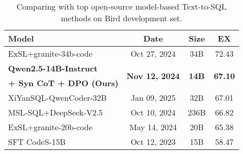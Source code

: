 \begin{table}[h!]
    \centering
\begin{adjustbox}{max width=0.8\columnwidth}
    \begin{tabular}{l | c | c | c }
    \toprule
       \textbf{Model}  & \textbf{Date} & \textbf{Size} &  \textbf{EX} \\
    \midrule
        ExSL+granite-34b-code	& Oct 27, 2024	& 34B	& 72.43 \\
    \midrule
    \textbf{Qwen2.5-14B-Instruct} & \multirow{2}{*}{\textbf{Nov 12, 2024}}	& \multirow{2}{*}{\textbf{14B}}	& \multirow{2}{*}{\textbf{67.10}} \\ 
    \textbf{+ Syn CoT + DPO (Ours)}	& & & \\
    \midrule
    XiYanSQL-QwenCoder-32B & Jan 09, 2025 & 32B & 67.01 \\
    \midrule
    MSL-SQL+DeepSeek-V2.5 &	Oct 10, 2024 &	236B &	66.82 \\
    \midrule
    ExSL+granite-20b-code & May 14, 2024 & 20B & 65.38 \\
    \midrule
    SFT CodeS-15B &	Oct 12, 2023 &	15B & 58.47 \\
    \bottomrule
    \end{tabular}
\end{adjustbox}
\caption{Comparing with top open-source model-based Text-to-SQL methods on Bird development set.}
\label{tab:BestModels}
\end{table}
